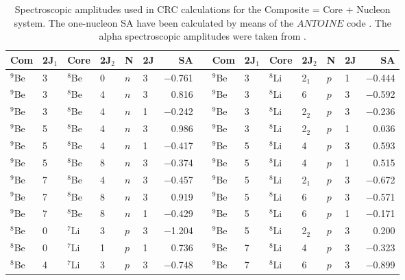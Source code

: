 \documentclass[
12pt, %
oneside, %
english, %
doublespacing, %
doublespacing, %
toctotoc, %
parskip, %
headsepline, %
]{MastersDoctoralThesis} %
\begin{document}
\begin{table*}[tp]
\footnotesize
\caption{\label{dbe_SA}  Spectroscopic amplitudes used in CRC calculations for the Composite = Core + Nucleon system. The one-nucleon SA have been calculated by means of the $ANTOINE$ code \cite{antoine}. The alpha spectroscopic amplitudes were taken from  \cite{volya, volya2017}. }
\begin{tabular*}{\textwidth}{@{\extracolsep{\fill}}llllllrl@{\extracolsep{\fill}}llllllr@{\extracolsep{\fill}}}
\toprule
Com & 2J$_{1}$ & Core & 2J$_{2}$ & N & 2J & SA &    & Com & 2J$_{1}$ & Core & 2J$_{2}$ & N & 2J & SA      \\
\midrule 
$^9$Be  & 3  & ${}^8$Be   & 0   & $n$       & 3   & $-$0.761 &  & ${}^9$Be  & 3  & ${}^8$Li   & 2$_1$    & $p$       & 1   & $-$0.444  \\
$^9$Be  & 3  & ${}^8$Be   & 4   & $n$       & 3   & 0.816  &  & ${}^9$Be  & 3  & ${}^8$Li    & 6   & $p$       & 3   & $-$0.592  \\
$^9$Be  & 3  & ${}^8$Be   & 4   & $n$       & 1   & $-$0.242 &  & ${}^9$Be  & 3  & ${}^8$Li    & 2$_2$   & $p$       & 3   & $-$0.236  \\
$^9$Be  & 5  & ${}^8$Be   & 4   & $n$       & 3   & 0.986  &  & ${}^9$Be  & 3  & ${}^8$Li    & 2$_2$   & $p$       & 1   & 0.036   \\
$^9$Be  & 5  & ${}^8$Be   & 4   & $n$       & 1   & $-$0.417 &  & ${}^9$Be  & 5  & ${}^8$Li    & 4   & $p$       & 3   & 0.593   \\
$^9$Be  & 5  & ${}^8$Be   & 8   & $n$       & 3   & $-$0.374 &  & ${}^9$Be  & 5  & ${}^8$Li    & 4   & $p$       & 1   & 0.515   \\
$^9$Be  & 7  & ${}^8$Be   & 4   & $n$       & 3   & $-$0.457 &  & ${}^9$Be  & 5  & ${}^8$Li   & 2$_1$    & $p$       & 3   & $-$0.672  \\
$^9$Be  & 7  & ${}^8$Be   & 8   & $n$       & 3   & 0.919  &  & ${}^9$Be  & 5  & ${}^8$Li    & 6   & $p$       & 3   & $-$0.571  \\
$^9$Be  & 7  & ${}^8$Be   & 8   & $n$       & 1   & $-$0.429 &  & ${}^9$Be  & 5  & ${}^8$Li    & 6   & $p$       & 1   & $-$0.171  \\
$^8$Be  & 0  & ${}^7$Li   & 3   & $p$       & 3   & $-$1.204 &  & ${}^9$Be  & 5  & ${}^8$Li    & 2$_2$   & $p$       & 3   & 0.200     \\
$^8$Be  & 0  & ${}^7$Li   & 1   & $p$       & 1   & 0.736  &  & ${}^9$Be  & 7  & ${}^8$Li    & 4   & $p$       & 3   & $-$0.323  \\
$^8$Be  & 4  & ${}^7$Li   & 3   & $p$       & 3   & $-$0.748 &  & ${}^9$Be  & 7  & ${}^8$Li    & 6   & $p$       & 3   & $-$0.899  \\

\end{tabular*}
\end{table*}
\end{document}
